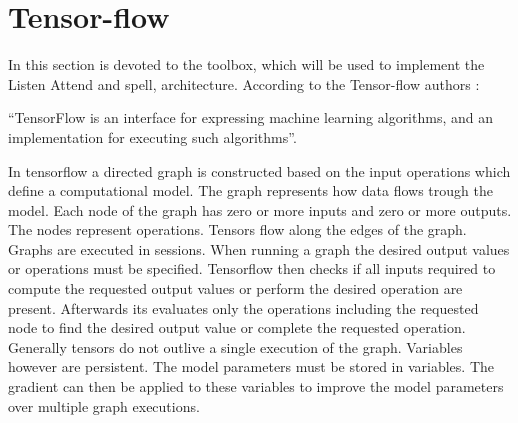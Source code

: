 \section{Tensor-flow}
In this section is devoted to the toolbox, which will be used to implement the Listen Attend and spell, architecture. According to the Tensor-flow authors \cite{Agarwal2015}:

\enquote{TensorFlow is an interface for expressing machine learning algorithms, and an implementation for executing such algorithms}.

In tensorflow a directed graph is constructed based on the input operations which define a computational model. The graph represents how data flows trough the model. Each node of the graph has zero or more inputs and zero or more outputs. The nodes represent operations. Tensors flow along the edges of the graph.
Graphs are executed in sessions. When running a graph the desired output values or operations must be specified. Tensorflow then checks if all inputs required to compute the requested output values or perform the desired operation are present. Afterwards its evaluates only the operations including the requested node to find the desired output value or complete the requested operation.
Generally tensors do not outlive a single execution of the graph. Variables however are persistent. The model parameters must be stored in variables. The gradient can then be applied to these variables to improve the model parameters over multiple graph executions.